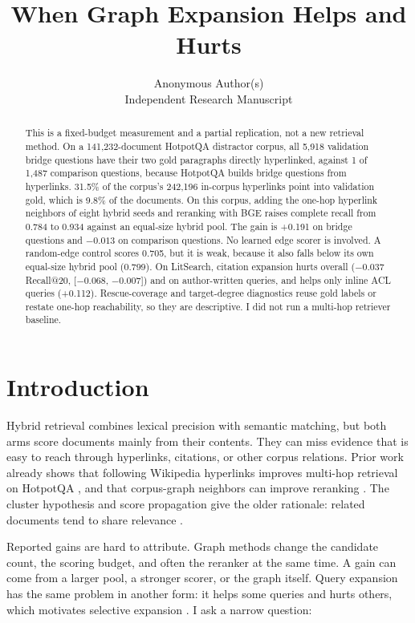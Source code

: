 \documentclass[10pt,twocolumn]{article}
\title{\vspace{-1.5em}\textbf{When Graph Expansion Helps and Hurts}}
\author{Anonymous Author(s)\\
\small Independent Research Manuscript}
\date{}
\begin{document}
\maketitle
\thispagestyle{fancy}

\begin{abstract}
This is a fixed-budget measurement and a partial replication, not a new
retrieval method. On a 141,232-document HotpotQA distractor corpus, all 5,918
validation bridge questions have their two gold paragraphs directly
hyperlinked, against 1 of 1,487 comparison questions, because HotpotQA builds
bridge questions from hyperlinks. 31.5\% of the corpus's 242,196 in-corpus
hyperlinks point into validation gold, which is 9.8\% of the documents. On
this corpus, adding the one-hop hyperlink neighbors of eight hybrid seeds and
reranking with BGE raises complete recall from 0.784 to 0.934 against an
equal-size hybrid pool. The gain is +0.191 on bridge questions and $-0.013$ on
comparison questions. No learned edge scorer is involved. A random-edge control
scores 0.705, but it is weak, because it also falls below its own equal-size
hybrid pool (0.799). On LitSearch, citation expansion hurts overall
($-0.037$ Recall@20, [$-0.068$, $-0.007$]) and on author-written queries, and
helps only inline ACL queries (+0.112). Rescue-coverage and target-degree
diagnostics reuse gold labels or restate one-hop reachability, so they are
descriptive. I did not run a multi-hop retriever baseline.
\end{abstract}

\section{Introduction}

Hybrid retrieval combines lexical precision with semantic matching, but both
arms score documents mainly from their contents. They can miss evidence that is
easy to reach through hyperlinks, citations, or other corpus relations. Prior
work already shows that following Wikipedia hyperlinks improves multi-hop
retrieval on HotpotQA \citep{asai2020paths}, and that corpus-graph neighbors
can improve reranking \citep{macavaney2022gar}. The cluster hypothesis and
score propagation give the older rationale: related documents tend to share
relevance \citep{voorhees1985cluster,diaz2005regularizing}.

Reported gains are hard to attribute. Graph methods change the candidate count,
the scoring budget, and often the reranker at the same time. A gain can come
from a larger pool, a stronger scorer, or the graph itself. Query expansion has
the same problem in another form: it helps some queries and hurts others, which
motivates selective expansion \citep{cronentownsend2004selective}. I ask a
narrow question:
\end{document}
